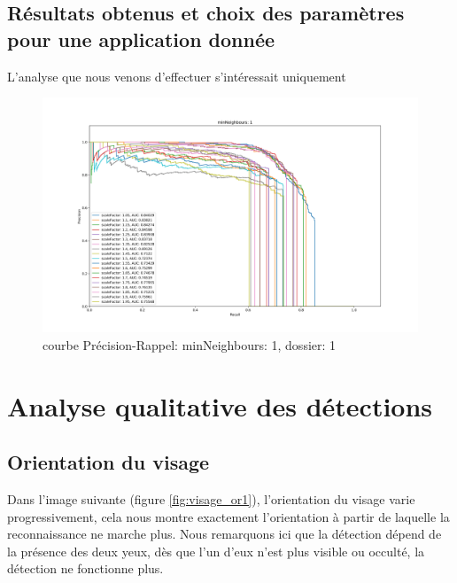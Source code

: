 \documentclass[a4paper,11pt]{article}
\begin{document}
        \subsection{Résultats obtenus et choix des paramètres pour une application donnée}

            L'analyse que nous venons d'effectuer s'intéressait uniquement
            \label{results}
	        \begin{figure}[H]
	            \begin{center}
	        	\includegraphics[scale = 0.4]{images/courbes/folder_01_minN_1.png}
	        	\caption{courbe Précision-Rappel: minNeighbours: 1, dossier: 1}
	        	\label{fig:minN_1}
	            \end{center}
	        \end{figure}


\section{Analyse qualitative des détections}
    
    \subsection{Orientation du visage}
	
	Dans l'image suivante (figure \ref{fig:visage_or1}), l'orientation du visage varie
	progressivement, cela nous montre exactement l'orientation à partir de laquelle la
	reconnaissance ne marche plus. Nous remarquons ici que la détection dépend de la présence
	des deux yeux, dès que l'un d'eux n'est plus visible ou occulté, la détection ne fonctionne
	plus.
\end{document}
